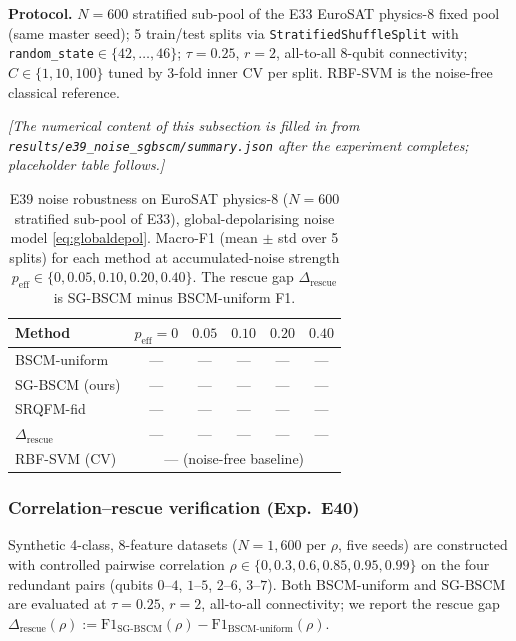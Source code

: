 \documentclass[pdflatex,sn-mathphys-num]{sn-jnl}
\theoremstyle{thmstyleone}
\theoremstyle{thmstyletwo}
\theoremstyle{thmstylethree}
\begin{document}
\textbf{Protocol.}
$N=600$ stratified sub-pool of the E33 EuroSAT physics-8 fixed pool
(same master seed); 5 train/test splits via
\texttt{StratifiedShuffleSplit} with
\texttt{random\_state}$\in\{42,\dots,46\}$; $\tau=0.25$, $r=2$,
all-to-all 8-qubit connectivity; $C\in\{1,10,100\}$ tuned by 3-fold
inner CV per split. RBF-SVM is the noise-free classical reference.

\noindent \emph{[The numerical content of this subsection is filled
in from \texttt{results/e39\_noise\_sgbscm/summary.json} after the
experiment completes; placeholder table follows.]}

\begin{table}[htbp]
\caption{E39 noise robustness on EuroSAT physics-8 ($N=600$
stratified sub-pool of E33), global-depolarising noise model
\eqref{eq:globaldepol}. Macro-F1 (mean $\pm$ std over 5 splits) for
each method at accumulated-noise strength
$p_{\text{eff}} \in \{0, 0.05, 0.10, 0.20, 0.40\}$. The rescue gap
$\Delta_{\text{rescue}}$ is SG-BSCM minus BSCM-uniform F1.}
\label{tab:e39}
\begin{tabular}{lccccc}
\toprule
Method & $p_{\text{eff}}\!=\!0$ & $0.05$ & $0.10$ & $0.20$ & $0.40$ \\
\midrule
BSCM-uniform   & --- & --- & --- & --- & --- \\
SG-BSCM (ours) & --- & --- & --- & --- & --- \\
SRQFM-fid      & --- & --- & --- & --- & --- \\
\midrule
$\Delta_{\text{rescue}}$ & --- & --- & --- & --- & --- \\
\midrule
RBF-SVM (CV)   & \multicolumn{5}{c}{--- (noise-free baseline)} \\
\bottomrule
\end{tabular}
\end{table}

\subsubsection{Correlation--rescue verification (Exp.\ E40)}\label{sec:rho-results}
Synthetic 4-class, 8-feature datasets ($N=1{,}600$ per $\rho$,
five seeds) are constructed with controlled pairwise correlation
$\rho\in\{0,0.3,0.6,0.85,0.95,0.99\}$ on the four redundant pairs
(qubits $0$--$4$, $1$--$5$, $2$--$6$, $3$--$7$). Both BSCM-uniform
and SG-BSCM are evaluated at $\tau=0.25$, $r=2$, all-to-all
connectivity; we report the rescue gap
$\Delta_{\mathrm{rescue}}(\rho) := \mathrm{F1}_{\text{SG-BSCM}}(\rho) - \mathrm{F1}_{\text{BSCM-uniform}}(\rho)$.
\end{document}
